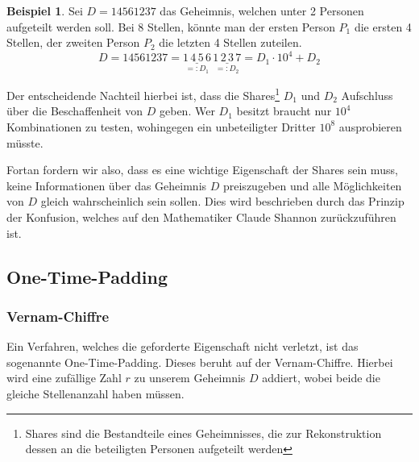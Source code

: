 \documentclass[12pt, a4paper, oneside, titlepage]{report}
\theoremstyle{definition}
\newtheorem{bsp}[lemma]{Beispiel}
\begin{document}
		\begin{bsp}
			Sei $ D = 14561237 $ das Geheimnis, welchen unter 2 Personen aufgeteilt werden soll. Bei 8 Stellen, könnte man der ersten Person $ P_1 $ die ersten 4 Stellen, der zweiten Person $ P_2 $ die letzten 4 Stellen zuteilen.
			$$ D = 14561237 = \underset{=:D_1}{\underline{1\,4\,5\,6}} \, \underset{=:D_2}{\underline{1\,2\,3\,7}} = D_1 \cdot 10^4 + D_2 $$
		\end{bsp}
		
		Der entscheidende Nachteil hierbei ist, dass die Shares\footnote{Shares sind die Bestandteile eines Geheimnisses, die zur Rekonstruktion dessen an die beteiligten Personen aufgeteilt werden} $ D_1 $ und $ D_2 $ Aufschluss über die Beschaffenheit von $ D $ geben. Wer $ D_1 $ besitzt braucht nur $ 10^4 $ Kombinationen zu testen, wohingegen ein unbeteiligter Dritter $ 10^8 $ ausprobieren müsste.
		
		Fortan fordern wir also, dass es eine wichtige Eigenschaft der Shares sein muss, keine Informationen über das Geheimnis $ D $ preiszugeben und alle Möglichkeiten von $ D $ gleich wahrscheinlich sein sollen. Dies wird beschrieben durch das Prinzip der Konfusion, welches auf den Mathematiker Claude Shannon zurückzuführen ist.\cite{shannon}
		
	\subsection{One-Time-Padding}
	\subsubsection{Vernam-Chiffre}
		 Ein Verfahren, welches die geforderte Eigenschaft nicht verletzt, ist das sogenannte One-Time-Padding. Dieses beruht auf der Vernam-Chiffre. Hierbei wird eine zufällige Zahl $ r $ zu unserem Geheimnis $ D $  addiert, wobei beide die gleiche Stellenanzahl haben müssen.
	
\end{document}
